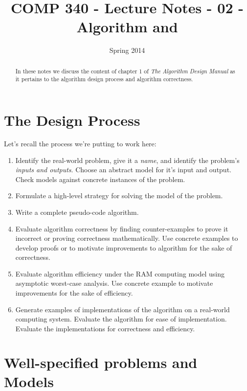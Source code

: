 \documentclass[]{tufte-handout}
\title{COMP 340 - Lecture Notes - 02 - Algorithm and  }
\date{Spring 2014}
\begin{document}
\maketitle

\begin{abstract}
In these notes we discuss the content of chapter 1 of \textit{The Algorithm Design Manual} as it pertains to the algorithm design process and algorithm correctness.
\end{abstract}

\section{The Design Process}

Let's recall the process we're putting to work here:
\begin{enumerate}
\item Identify the real-world problem, give it a \textit{name}, and identify the problem's \textit{inputs and outputs}. Choose an abstract model for it's input and output. Check models against concrete instances of the problem. 
\item Formulate a high-level strategy for solving the model of the problem.
\item Write a complete pseudo-code algorithm. 
\item Evaluate algorithm correctness by finding counter-examples to prove it incorrect or proving correctness mathematically. Use concrete examples to develop proofs or to motivate improvements to algorithm for the sake of correctness.
\item Evaluate algorithm efficiency under the RAM computing model using asymptotic worst-case analysis. Use concrete example to motivate improvements for the sake of efficiency.
\item Generate examples of implementations of the algorithm on a real-world computing system. Evaluate the algorithm for ease of implementation. Evaluate the implementations for correctness and efficiency.
\end{enumerate}

\section{Well-specified problems and Models}
\end{document}
